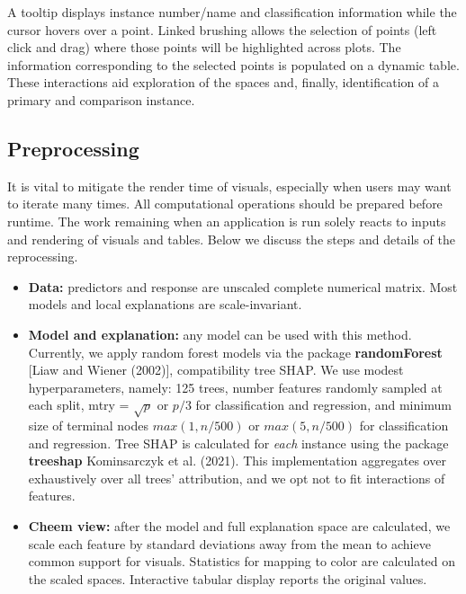 \documentclass[
]{article}
\begin{document}
A tooltip displays instance number/name and classification information while the cursor hovers over a point. Linked brushing allows the selection of points (left click and drag) where those points will be highlighted across plots. The information corresponding to the selected points is populated on a dynamic table. These interactions aid exploration of the spaces and, finally, identification of a primary and comparison instance.

\hypertarget{preprocessing}{%
\subsection{Preprocessing}\label{preprocessing}}

It is vital to mitigate the render time of visuals, especially when users may want to iterate many times. All computational operations should be prepared before runtime. The work remaining when an application is run solely reacts to inputs and rendering of visuals and tables. Below we discuss the steps and details of the reprocessing.




\begin{itemize}
    \item \textbf{Data:} predictors and response are unscaled complete numerical matrix. Most models and local explanations are scale-invariant.
    \item \textbf{Model and explanation:} any model can be used with this method. Currently, we apply random forest models via the package \textbf{randomForest} [Liaw and Wiener (2002)], compatibility tree SHAP. We use modest hyperparameters, namely: 125 trees, number features randomly sampled at each split, mtry = $\sqrt{p}$ or $p/3$ for classification and regression, and minimum size of terminal nodes $max(1, n/500)$ or $max(5, n/500)$ for classification and regression. Tree SHAP is calculated for \emph{each} instance using the package \textbf{treeshap} Kominsarczyk et al. (2021). This implementation aggregates over exhaustively over all trees' attribution, and we opt not to fit interactions of features. 
    \item \textbf{Cheem view:} after the model and full explanation space are calculated, we scale each feature by standard deviations away from the mean to achieve common support for visuals. Statistics for mapping to color are calculated on the scaled spaces. Interactive tabular display reports the original values.
\end{itemize}
\end{document}
